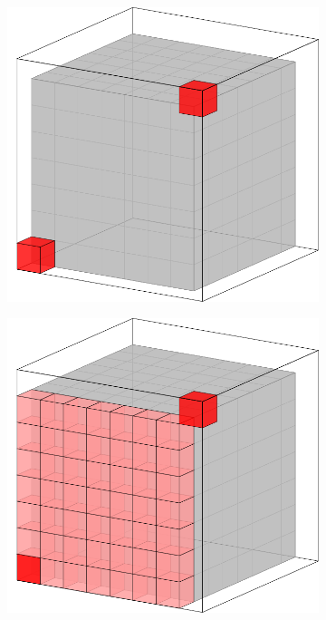 \begin{figure}[]
\centering
\begin{subfigure}{0.21\textwidth}
	\includegraphics[width=\textwidth]{figures/1/torus.pdf}
	\caption{}
	\label{fig:torus_a}
\end{subfigure} \hfill%
\begin{subfigure}{0.21\textwidth}
	\includegraphics[width=\textwidth]{figures/1/torus_2.pdf}

\end{subfigure}
\end{figure}
